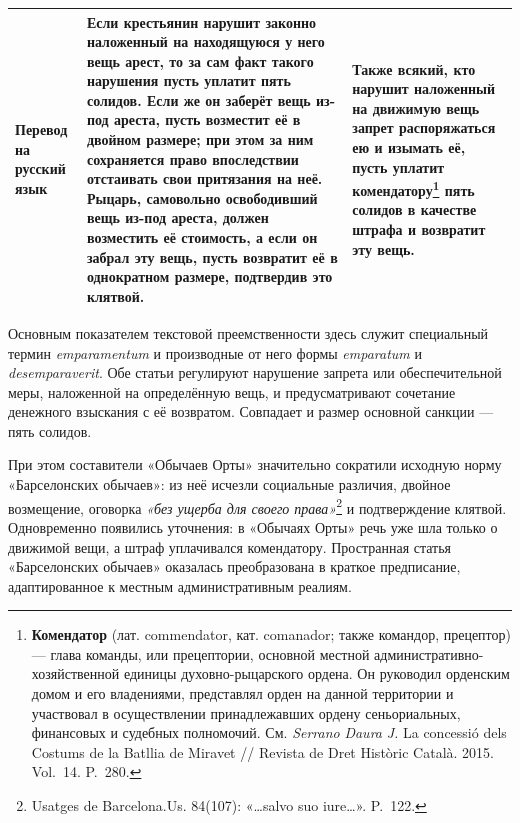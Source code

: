 \begin{center}
\begin{longtable}{|p{}|p{}|p{}|}
\textbf{Перевод на русский язык} & Если крестьянин нарушит законно наложенный на находящуюся у него вещь арест, то за сам факт такого нарушения пусть уплатит пять солидов. Если же он заберёт вещь из-под ареста, пусть возместит её в двойном размере; при этом за ним сохраняется право впоследствии отстаивать свои притязания на неё. Рыцарь, самовольно освободивший вещь из-под ареста, должен возместить её стоимость, а если он забрал эту вещь, пусть возвратит её в однократном размере, подтвердив это клятвой. & Также всякий, кто нарушит наложенный на движимую вещь запрет распоряжаться ею и изымать её, пусть уплатит комендатору\footnote{\textbf{Комендатор}\textbf{ }(лат. commendator, кат. comanador; также командор, прецептор) --- глава команды, или прецептории, основной местной административно-хозяйственной единицы духовно-рыцарского ордена. Он руководил орденским домом и его владениями, представлял орден на данной территории и участвовал в осуществлении принадлежавших ордену сеньориальных, финансовых и судебных полномочий. См. \emph{Serrano}\emph{ }\emph{Daura}\emph{ J. }La concessió dels Costums de la Batllia de Miravet // Revista de Dret Històric Català. 2015. Vol.~14. P.~280.} пять солидов в качестве штрафа и возвратит эту вещь. \\ \hline
\end{longtable}
\end{center}

Основным показателем текстовой преемственности здесь служит специальный термин \emph{emparamentum} и производные от него формы \emph{emparatum} и \emph{desemparaverit}. Обе статьи регулируют нарушение запрета или обеспечительной меры, наложенной на определённую вещь, и предусматривают сочетание денежного взыскания с её возвратом. Совпадает и размер основной санкции --- пять солидов.

При этом составители «Обычаев Орты» значительно сократили исходную норму «Барселонских обычаев»: из неё исчезли социальные различия, двойное возмещение, оговорка \emph{«}\emph{без ущерба для своего права}\emph{»}\footnote{Usatges de Barcelona.Us. 84(107): «…salvo suo iure…». P.~122.} и подтверждение клятвой. Одновременно появились уточнения: в «Обычаях Орты» речь уже шла только о движимой вещи, а штраф уплачивался комендатору. Пространная статья «Барселонских обычаев» оказалась преобразована в краткое предписание, адаптированное к местным административным реалиям.

